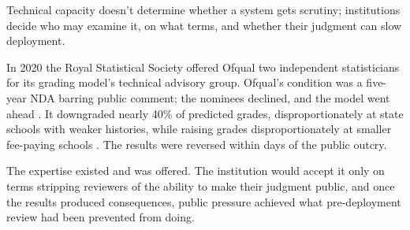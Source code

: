 Technical capacity doesn't determine whether a system gets scrutiny; institutions decide who may examine it, on what terms, and whether their judgment can slow deployment.

In 2020 the Royal Statistical Society offered Ofqual two independent statisticians for its grading model's technical advisory group. Ofqual's condition was a five-year NDA barring public comment; the nominees declined, and the model went ahead \autocite{rss2020ofqual}. It downgraded nearly 40\% of predicted grades, disproportionately at state schools with weaker histories, while raising grades disproportionately at smaller fee-paying schools \autocite{cnbc2020ofqual}. The results were reversed within days of the public outcry.

The expertise existed and was offered. The institution would accept it only on terms stripping reviewers of the ability to make their judgment public, and once the results produced consequences, public pressure achieved what pre-deployment review had been prevented from doing.
